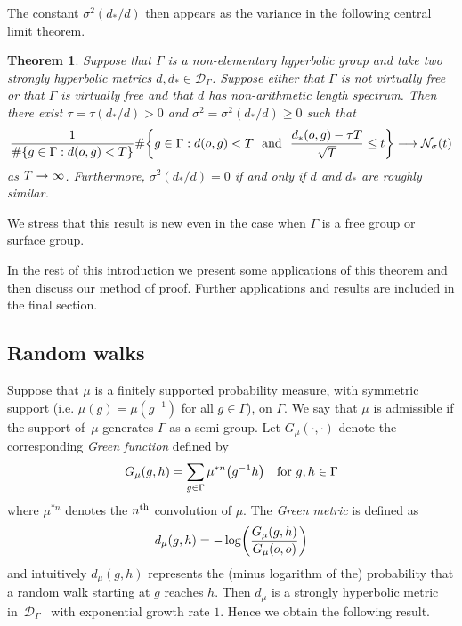 \documentclass[AHL,Unicode,longabstracts,published]{cedram}
\newcommand{\G}{\Gamma}
\newcommand{\Dc}{\mathcal{D}}
\newcommand{\Nc}{\mathcal{N}}
\let\originalleft\left
\let\originalright\right
\renewcommand{\left}{\mathopen{}\mathclose\bgroup\originalleft}
\renewcommand{\right}{\aftergroup\egroup\originalright}
\renewcommand*{\to}{\mathchoice{\longrightarrow}{\rightarrow}{\rightarrow}{\rightarrow}}
\newcounter{setofcase}
\newcounter{case}[setofcase]
\theoremstyle{plain}
\newtheorem{theol}{Theorem}
\newcommand{\G}{\Gamma}
\begin{document}
The constant $\sigma^2(d_\ast/d)$ then appears as the variance in the following central limit theorem.

\begin{theol}\label{thm.main}
Suppose that $\G$ is a non-elementary hyperbolic group and take two strongly hyperbolic metrics $d,d_\ast \in \Dc_\G$. Suppose either that $\G$ is not virtually free or that $\G$ is virtually free and that $d$ has non-arithmetic length spectrum. Then there exist $\tau = \tau(d_\ast/d) >0$ and $\sigma^2 = \sigma^2(d_\ast/d) \ge 0$ such that
\[
\frac{1}{\#\left\{ g \in \G: d(o,g) < T\right\}} \#\left\{ g \in \G: d(o,g) < T \ \text{ and } \ \frac{d_\ast(o,g) - \tau T}{\sqrt{T}} \le t \right\} \to \Nc_\sigma(t)
\]
as $T\to\infty$. Furthermore, $\sigma^2(d_\ast/d) = 0$ if and only if $d$ and $d_\ast$ are roughly similar.
\end{theol}

We stress that this result is new even in the case when $\G$ is a free group or surface group.


In the rest of this introduction we present some applications of this theorem and then discuss our method of proof. Further applications and results are included in the final section.

\subsection{Random walks}

Suppose that $\mu$ is a finitely supported probability measure, with symmetric support (i.e. $\mu(g) = \mu(g^{-1})$ for all $g \in\G$), on $\G$. We say that $\mu$ is admissible if the support of~$\mu$ generates $\G$ as a semi-group. Let $G_\mu(\cdot, \cdot)$ denote the corresponding \emph{Green function} defined by
\[
G_\mu(g,h) = \sum_{g \in\G} \mu^{\ast n} \left(g^{-1}h\right) \quad \text{for }g,h \in \G
\]
where $\mu^{\ast n}$ denotes the $n^{\rm th}$ convolution of $\mu$. The \emph{Green metric} is defined as
\[
d_\mu(g,h) = - \log \left(\frac{G_\mu(g,h)}{G_\mu(o,o)}\right)
\]
and intuitively $d_\mu(g,h)$ represents the (minus logarithm of the) probability that a random walk starting at $g$ reaches $h$. Then $d_\mu$ is a strongly hyperbolic metric in~$\Dc_\G$~\cite{Nica.Spakula} with exponential growth rate $1$. Hence we obtain the following result.
\end{document}

